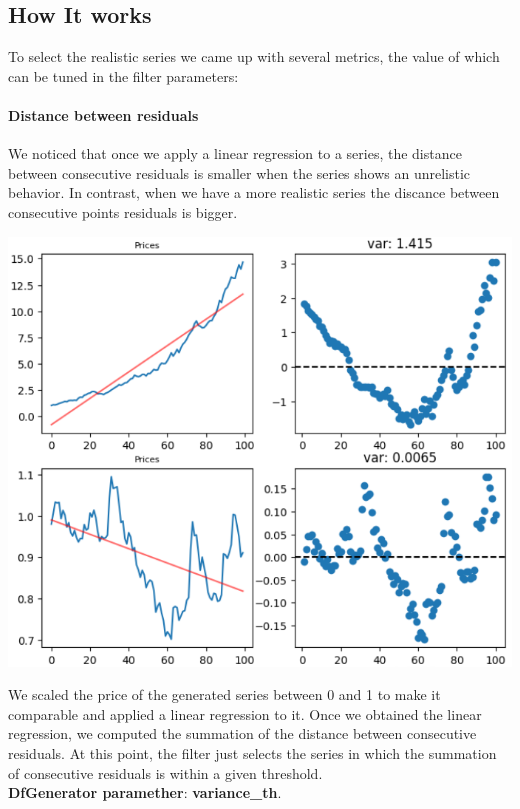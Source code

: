 \documentclass{article}
\begin{document}
\begin{multicols}{2}
    \section*{How It works}
    To select the realistic series we came up with several metrics, the value of which can be tuned in the filter parameters:
    \paragraph*{Distance between residuals}
    We noticed that once we apply a linear regression to a series, the distance between consecutive residuals is smaller when the series shows an unrelistic behavior.
    In contrast, when we have a more realistic series the discance between consecutive points residuals is bigger.
    \begin{center}
        \includegraphics[scale=0.6]{imgs/2_res.png}
    \end{center}
    We scaled the price of the generated series between 0 and 1 to make it comparable and applied a linear regression to it. Once we obtained the linear regression, we computed the summation of the distance between consecutive residuals. 
    At this point, the filter just selects the series in which the summation of consecutive residuals is within a given threshold.\\
    \textbf{DfGenerator paramether}:  \textbf{variance\_th}.

\end{multicols}
\end{document}
